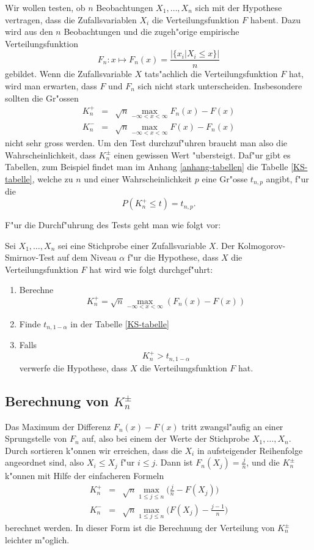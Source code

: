 Wir wollen testen, ob $n$ Beobachtungen $X_1,\dots,X_n$ sich mit
der Hypothese vertragen, dass die Zufallsvariablen $X_i$ die
Verteilungsfunktion $F$ habent. Dazu wird aus den $n$ Beobachtungen
und die zugeh"orige empirische Verteilungsfunktion
\[
F_n\colon x\mapsto F_n(x)=\frac{|\{x_i|X_i\le x\}|}{n}
\]
gebildet. Wenn die Zufallsvariable $X$ tats"achlich die
Verteilungsfunktion $F$ hat, wird man erwarten,
dass $F$ und $F_n$ sich nicht stark unterscheiden.
Insbesondere sollten die Gr"ossen
\begin{eqnarray}
K_n^+&=&\sqrt{n}\max_{-\infty<x<\infty} F_n(x)-F(x)\\
K_n^-&=&\sqrt{n}\max_{-\infty<x<\infty} F(x)-F_n(x)
\end{eqnarray}
nicht sehr gross werden. Um den Test durchzuf"uhren braucht man also
die Wahrscheinlichkeit, dass $K_n^{\pm}$ einen gewissen Wert "ubersteigt.
Daf"ur gibt es Tabellen, zum Beispiel findet man im Anhang \ref{anhang-tabellen}
die Tabelle \ref{KS-tabelle}, welche zu $n$ und einer Wahrscheinlichkeit
$p$ eine Gr"osse $t_{n,p}$ angibt, f"ur die
\[
P(K_n^+\le t)=t_{n,p}.
\]

F"ur die Durchf"uhrung des Tests geht man wie folgt vor:
\begin{satz} Sei $X_1,\dots,X_n$ sei eine Stichprobe einer Zufallsvariable $X$.
Der Kolmogorov-Smirnov-Test auf dem Niveau $\alpha$ f"ur die Hypothese,
dass $X$ die Verteilungsfunktion $F$ hat wird wie folgt durchgef"uhrt:
\begin{enumerate}
\item Berechne
\[
K_n^+ = \sqrt{n}\max_{-\infty<x<\infty} (F_n(x)-F(x))
\]
\item Finde $t_{n,1-\alpha}$ in der Tabelle \ref{KS-tabelle}
\item Falls
\[
K_n^+>t_{n,1-\alpha}
\]
verwerfe die Hypothese, dass $X$ die Verteilungsfunktion $F$ hat.
\end{enumerate}
\end{satz}

\subsection{Berechnung von \texorpdfstring{$K_n^{\pm}$}{Kn-plus-minus}}
Das Maximum der Differenz $F_n(x)-F(x)$ tritt zwangsl"aufig an einer
Sprungstelle von $F_n$ auf, also bei einem der Werte der Stichprobe
$X_1,\dots,X_n$. Durch sortieren k"onnen wir erreichen, dass die
$X_i$  in aufsteigender Reihenfolge angeordnet sind, also $X_i\le X_j$
f"ur $i\le j$. Dann ist $F_n(X_j)=\frac{j}{n}$, und
die  $K_n^{\pm}$ k"onnen mit Hilfe der einfacheren Formeln
\begin{eqnarray}
K_n^+&=&\sqrt{n}\max_{1\le j\le n}\biggl(\frac{j}{n}-F(X_j)\biggr)
\label{knp-berechnungs-formel}
\\
K_n^-&=&\sqrt{n}\max_{1\le j\le n}\biggl(F(X_j)-\frac{j-1}n\biggr)
\end{eqnarray}
berechnet werden. In dieser Form ist die Berechnung der
Verteilung von $K_n^{\pm}$ leichter m"oglich.

